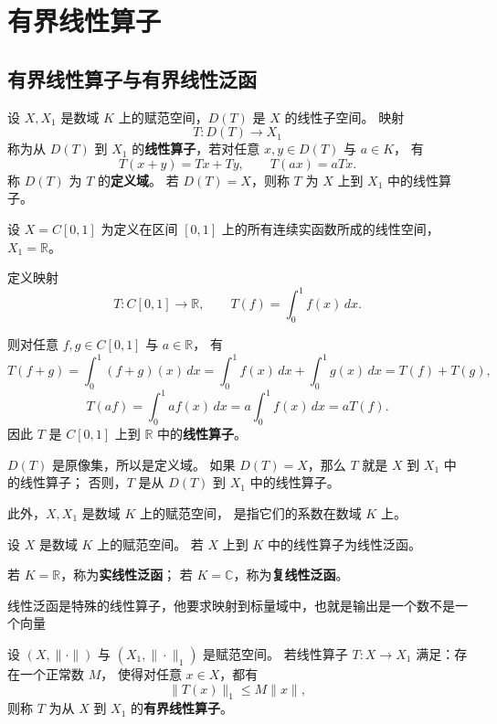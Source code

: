 \chapter{有界线性算子}
\section{有界线性算子与有界线性泛函}
\begin{definition}
设 $X, X_1$ 是数域 $K$ 上的赋范空间，$D(T)$ 是 $X$ 的线性子空间。
映射
\[
T: D(T) \to X_1
\]
称为从 $D(T)$ 到 $X_1$ 的\textbf{线性算子}，若对任意 $x,y \in D(T)$ 与 $a \in K$，
有
\[
T(x+y)=Tx+Ty, \qquad T(ax)=aTx.
\]
称 $D(T)$ 为 $T$ 的\textbf{定义域}。  
若 $D(T)=X$，则称 $T$ 为 $X$ 上到 $X_1$ 中的线性算子。
\end{definition}
\begin{example}[线性算子的具体例子]
设 $X=C[0,1]$ 为定义在区间 $[0,1]$ 上的所有连续实函数所成的线性空间，
$X_1=\mathbb{R}$。

定义映射
\[
T: C[0,1] \to \mathbb{R}, \qquad
T(f)=\int_0^1 f(x)\,dx.
\]

则对任意 $f,g\in C[0,1]$ 与 $a\in\mathbb{R}$，
有
\[
T(f+g)=\int_0^1 (f+g)(x)\,dx
= \int_0^1 f(x)\,dx + \int_0^1 g(x)\,dx = T(f)+T(g),
\]
\[
T(af)=\int_0^1 af(x)\,dx = a\int_0^1 f(x)\,dx = aT(f).
\]
因此 $T$ 是 $C[0,1]$ 上到 $\mathbb{R}$ 中的\textbf{线性算子}。
\end{example}
\begin{note}
   $D(T)$ 是原像集，所以是定义域。  
如果 $D(T)=X$，那么 $T$ 就是 $X$ 到 $X_1$ 中的线性算子；  
否则，$T$ 是从 $D(T)$ 到 $X_1$ 中的线性算子。  

此外，$X, X_1$ 是数域 $K$ 上的赋范空间，  
是指它们的系数在数域 $K$ 上。

\end{note}
\begin{definition}[线性泛函]
设 $X$ 是数域 $K$ 上的赋范空间。  
若 $X$ 上到 $K$ 中的线性算子为线性泛函。

若 $K=\mathbb{R}$，称为\textbf{实线性泛函}；
若 $K=\mathbb{C}$，称为\textbf{复线性泛函}。
\end{definition}
\begin{note}
    线性泛函是特殊的线性算子，他要求映射到标量域中，也就是输出是一个数不是一个向量
\end{note}
\begin{definition}[有界线性算子]
设 $(X,\|\cdot\|)$ 与 $(X_1,\|\cdot\|_1)$ 是赋范空间。
若线性算子 $T:X\to X_1$ 满足：存在一个正常数 $M$，
使得对任意 $x\in X$，都有
\[
\|T(x)\|_1 \le M\|x\|,
\]
则称 $T$ 为从 $X$ 到 $X_1$ 的\textbf{有界线性算子}。
\end{definition}

